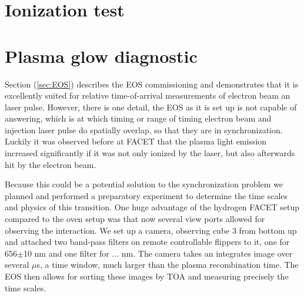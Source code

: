 

\section{Ionization test}


\section{Plasma glow diagnostic}
\label{sec:Plasma_Glow}
Section (\ref{sec:EOS}) describes the EOS commissioning and demonstrates that it is excellently suited for relative time-of-arrival measurements of electron beam an laser pulse. However, there is one detail, the EOS as it is set up is not capable of answering, which is  at which timing or range of timing electron beam and injection laser pulse do spatially overlap, so that they are in synchronization. 
Luckily it was observed before at FACET that the plasma light emission increased significantly if it was not only ionized by the laser, but also afterwards hit by the electron beam. 

Because this could be a potential solution to the synchronization problem we planned and performed a preparatory experiment to determine the time scales and physics of this transition. 
One huge advantage of the hydrogen FACET setup compared to the oven setup was that now several view ports allowed for observing the interaction. We set up a camera, observing cube 3 from bottom up and attached two band-pass filters on remote controllable flippers to it, one for  656$\pm$10 nm and one filter for ... nm.
The camera takes an integrates image over several $\mu$s, a time window, much larger than the plasma recombination time. The EOS then allows for sorting these images by TOA and measuring precisely the time scales.



